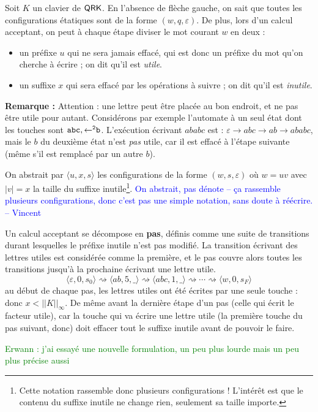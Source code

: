 \documentclass[12pt, a4paper]{article}
\newcommand{\Kinf}{||K||_{\infty}}
\newcommand{\vincent}[1]{\textcolor{blue}{#1 -- Vincent}}
\newcommand{\erwann}[1]{\textcolor{green}{Erwann : #1}}
\begin{document}
    Soit $K$ un clavier de $\mathsf{QRK}$. En l'absence de flèche gauche, on sait que toutes les configurations étatiques sont de la forme $(w,q,\varepsilon)$. De plus, lors d'un calcul acceptant, on peut à chaque étape diviser le mot courant $w$ en deux :
    \begin{itemize}
        \item un préfixe $u$ qui ne sera jamais effacé, qui est donc un préfixe du mot qu'on cherche à écrire ; on dit qu'il est \emph{utile}.
        \item un suffixe $x$ qui sera effacé par les opérations à suivre ; on dit qu'il est \emph{inutile}.
    \end{itemize}
    \textbf{Remarque :} Attention : une lettre peut être placée au bon endroit, et ne pas être utile pour autant. Considérons par exemple l'automate à un seul état dont les touches sont $\mathtt{abc},\mathtt{\mathord{\leftarrow}^2b}$. 
    L'exécution écrivant $ababc$ est : $\varepsilon \rightarrow abc \rightarrow ab \rightarrow ababc$, mais le $b$ du deuxième état n'est \emph{pas} utile, car il est effacé à l'étape suivante (même s'il est remplacé par un autre $b$). \smallskip

    On abstrait par $\langle u,x,s \rangle$ les configurations de la forme $(w,s,\varepsilon)$ où $w = uv$ avec $|v| = x$ la taille du suffixe inutile\footnote{Cette notation rassemble donc plusieurs configurations ! L'intérêt est que le contenu du suffixe inutile ne change rien, seulement sa taille importe.}. 
    \vincent{On abstrait, pas dénote -- ça rassemble plusieurs configurations, donc c’est pas une simple notation, sans doute à réécrire.}
    \begin{pas}
        Un calcul acceptant se décompose en \textbf{pas}, définis comme une suite de transitions durant lesquelles le préfixe inutile n'est pas modifié. La transition écrivant des lettres utiles est considérée comme la première, et le pas couvre alors toutes les transitions jusqu'à la prochaine écrivant une lettre utile. 
        \[ \langle\varepsilon,0,s_0\rangle \rightsquigarrow \langle ab,5,\_\rangle \rightsquigarrow \langle abc,1,\_\rangle \rightsquigarrow \cdots \rightsquigarrow \langle w,0,s_F\rangle \]
        au début de chaque pas, les lettres utiles ont été écrites par une seule touche : donc $x < \Kinf$. De même avant la dernière étape d'un pas (celle qui écrit le facteur utile), car la touche qui va écrire une lettre utile (la première touche du pas suivant, donc) doit effacer tout le suffixe inutile avant de pouvoir le faire.
    \end{pas}
    \erwann{j'ai essayé une nouvelle formulation, un peu plus lourde mais un peu plus précise aussi}
\end{document}
